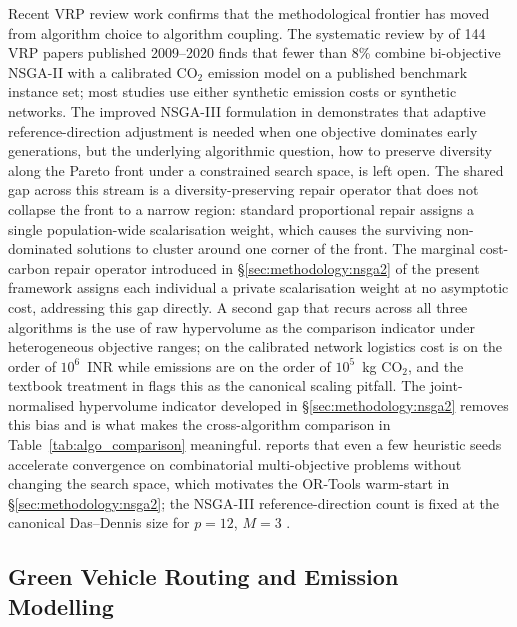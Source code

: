 \documentclass[review,preprint,authoryear,12pt]{elsarticle}
\newcommand{\COtwo}{\ensuremath{\mathrm{CO}_{2}}}
\begin{document}
Recent VRP review work confirms that the methodological frontier has
moved from algorithm choice to algorithm coupling. The systematic
review by \citet{konstantakopoulos2022vrp_review} of 144 VRP papers
published 2009--2020 finds that fewer than 8\% combine bi-objective
NSGA-II with a calibrated \COtwo{} emission model on a published
benchmark instance set; most studies use either synthetic emission
costs or synthetic networks. The improved NSGA-III formulation in
\citet{li2025nsga3_green_vrptw} demonstrates that adaptive
reference-direction adjustment is needed when one objective dominates
early generations, but the underlying algorithmic question, how to
preserve diversity along the Pareto front under a constrained search
space, is left open. The shared gap across this stream is a
diversity-preserving repair operator that does not collapse the front
to a narrow region: standard proportional repair assigns a single
population-wide scalarisation weight, which causes the surviving
non-dominated solutions to cluster around one corner of the front.
The marginal cost-carbon repair operator introduced in
\S\ref{sec:methodology:nsga2} of the present framework assigns each
individual a private scalarisation weight at no asymptotic cost,
addressing this gap directly. A second gap that recurs across all
three algorithms is the use of raw hypervolume as the comparison
indicator under heterogeneous objective ranges; on the calibrated
network logistics cost is on the order of $10^6$~INR while emissions
are on the order of $10^5$~kg \COtwo{}, and the textbook treatment in
\citet{deb2001moo_book} flags this as the canonical scaling pitfall.
The joint-normalised hypervolume indicator developed in
\S\ref{sec:methodology:nsga2} removes this bias and is what makes the
cross-algorithm comparison in Table~\ref{tab:algo_comparison}
meaningful. \citet{friedrich2014seeding} reports that even a few
heuristic seeds accelerate convergence on combinatorial multi-objective
problems without changing the search space, which motivates the
OR-Tools warm-start in \S\ref{sec:methodology:nsga2}; the NSGA-III
reference-direction count is fixed at the canonical Das--Dennis size
for $p=12$, $M=3$ \citep{debjain2014nsga3}.

\subsection{Green Vehicle Routing and Emission Modelling}
\label{sec:lit:greenvrp}
\end{document}
